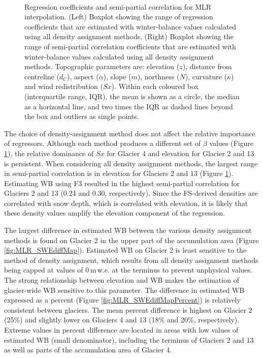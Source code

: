 \documentclass{sfuthesis}
\newcommand{\params}{Topographic parameters are: elevation ($z$), distance from centreline ($d_C$), aspect ($\alpha$), slope ($m$), northness ($N$), curvature ($\kappa$) and wind redistribution ($Sx$). }
\newcommand{\boxplot}{Within each coloured box (interquartile range, IQR), the mean is shown as a circle, the median as a horizontal line, and two times the IQR as dashed lines beyond the box and outliers as single points. }
\begin{document}
{\begin{figure}[H]
	\centering
	 \\
	\caption[Regression coefficients and semi-partial correlation for MLR interpolation]{Regression coefficients and semi-partial correlation for MLR interpolation. (Left) Boxplot showing the range of regression coefficients that are estimated with winter-balance values calculated using all density assignment methods. (Right) Boxplot showing the range of semi-partial correlation coefficients that are estimated with winter-balance values calculated using all density assignment methods. \params \boxplot }
	\label{fig:MLRsemiR2_densityOptions}
\end{figure} 

The choice of density-assignment method does not affect the relative importance of regressors. Although each method produces a different set of $\beta$ values (Figure \ref{fig:MLRsemiR2_densityOptions}), the relative dominance of $Sx$ for Glacier 4 and elevation for Glacier 2 and 13 is persistent. When considering all density assignment methods, the largest range in semi-partial correlation is in elevation for Glaciers 2 and 13 (Figure \ref{fig:MLRsemiR2_densityOptions}). Estimating WB using F3 resulted in the highest semi-partial correlation for Glaciers 2 and 13 (0.24 and 0.30, respectively). Since the FS-derived densities are correlated with snow depth, which is correlated with elevation, it is likely that these density values amplify the elevation component of the regression. 

The largest difference in estimated WB between the various density assignment methods is found on Glacier 2 in the upper part of the accumulation area (Figure \ref{fig:MLR_SWEdiffMap}). Estimated WB on Glacier 2 is least sensitive to the method of density assignment, which results from all density assignment methods being capped at values of 0\,m\,w.e. at the terminus to prevent unphysical values. The strong relationship between elevation and WB makes the estimation of glacier-wide WB sensitive to this parameter. The difference in estimated WB expressed as a percent (Figure \ref{fig:MLR_SWEdiffMapPercent}) is relatively consistent between glaciers. The mean percent difference is highest on Glacier 2 (25\%) and slightly lower on Glaciers 4 and 13 (18\% and 20\%, respectively). Extreme values in percent difference are located in areas with low values of estimated WB (small denominator), including the terminus of Glaciers 2 and 13 as well as parts of the accumulation area of Glacier 4.  

}
\end{document}
